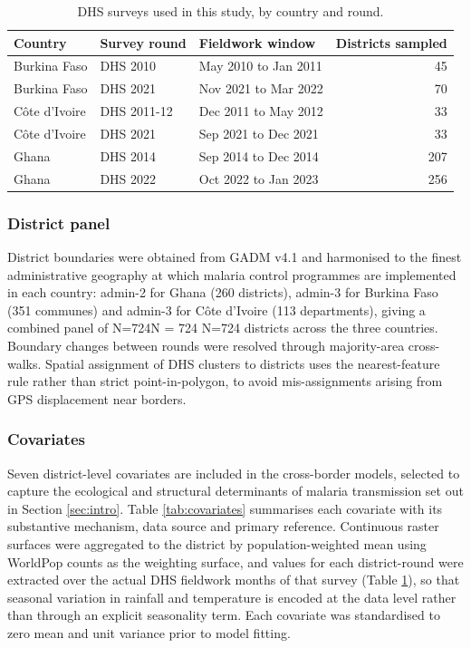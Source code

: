 \documentclass{article}
\begin{document}
\begingroup\fontsize{8}{10}\selectfont

\begin{longtable}[t]{lllr}
\caption{\label{tab:surveys}DHS surveys used in this study, by country and round. \label{tab:surveys}}\\
\toprule
Country & Survey round & Fieldwork window & Districts sampled\\
\midrule
Burkina Faso & DHS 2010 & May 2010 to Jan 2011 & 45\\
Burkina Faso & DHS 2021 & Nov 2021 to Mar 2022 & 70\\
Côte d'Ivoire & DHS 2011-12 & Dec 2011 to May 2012 & 33\\
Côte d'Ivoire & DHS 2021 & Sep 2021 to Dec 2021 & 33\\
Ghana & DHS 2014 & Sep 2014 to Dec 2014 & 207\\
\addlinespace
Ghana & DHS 2022 & Oct 2022 to Jan 2023 & 256\\
\bottomrule
\end{longtable}
\endgroup{}

\subsubsection{District panel}\label{district-panel}

\label{sec:panel} District boundaries were obtained from GADM v4.1 and
harmonised to the finest administrative geography at which malaria
control programmes are implemented in each country: admin-2 for Ghana
(260 districts), admin-3 for Burkina Faso (351 communes) and admin-3 for
Côte d'Ivoire (113 departments), giving a combined panel of N=724N = 724
N=724 districts across the three countries. Boundary changes between
rounds were resolved through majority-area cross-walks. Spatial
assignment of DHS clusters to districts uses the nearest-feature rule
rather than strict point-in-polygon, to avoid mis-assignments arising
from GPS displacement near borders.

\subsubsection{Covariates}\label{covariates}

\label{sec:covariates} Seven district-level covariates are included in
the cross-border models, selected to capture the ecological and
structural determinants of malaria transmission set out in Section
\ref{sec:intro}. Table \ref{tab:covariates} summarises each covariate
with its substantive mechanism, data source and primary reference.
Continuous raster surfaces were aggregated to the district by
population-weighted mean using WorldPop counts as the weighting surface,
and values for each district-round were extracted over the actual DHS
fieldwork months of that survey (Table \ref{tab:surveys}), so that
seasonal variation in rainfall and temperature is encoded at the data
level rather than through an explicit seasonality term. Each covariate
was standardised to zero mean and unit variance prior to model fitting.
\end{document}
